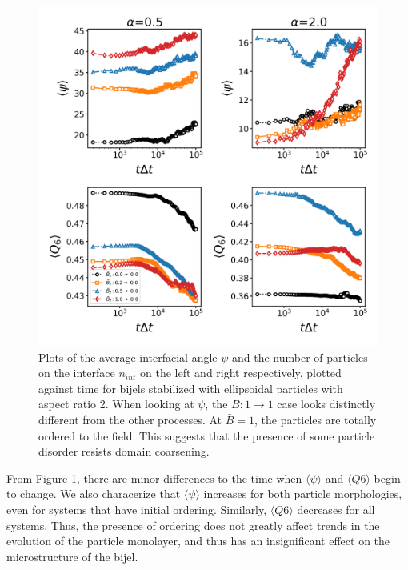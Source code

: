 \begin{figure} 
\centering 
\includegraphics[scale=0.4]{../figures/results/paper2/interface_angle-nint-field_down.png} 
\caption{Plots of the average interfacial angle $\psi$ and the number of particles on the interface $n_{int}$ on the left and right respectively, 
         plotted against time for bijels stabilized with ellipsoidal particles with aspect ratio 2. When looking at $\psi$, the $\bar{B}:1 \rightarrow 1$ 
         case looks distinctly different from the other processes. At $\bar{B} = 1$, the particles are totally ordered to the field. This suggests that 
         the presence of some particle disorder resists domain coarsening.} 
\label{fig:interface_angle-field_down} 
\end{figure}

From Figure \ref{fig:interface_angle-field_down}, there are minor differences to the time when $\langle \psi \rangle$ and $\langle Q6 \rangle$
begin to change. We also characerize that $\langle \psi \rangle$ increases for both particle morphologies, even for systems that have initial ordering.
Similarly, $\langle Q6 \rangle$ decreases for all systems. Thus, the presence of ordering does not greatly affect trends in the evolution of the
particle monolayer, and thus has an insignificant effect on the microstructure of the bijel.

